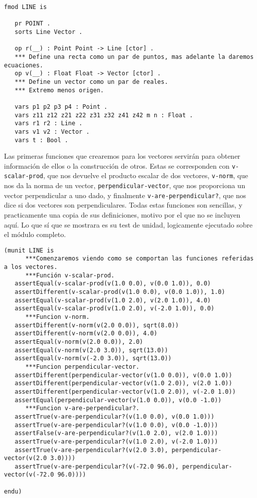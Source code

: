 {\codesize
\begin{verbatim}
fmod LINE is 

   pr POINT .
   sorts Line Vector .

   op r(__) : Point Point -> Line [ctor] .
   *** Define una recta como un par de puntos, mas adelante la daremos ecuaciones.
   op v(__) : Float Float -> Vector [ctor] .
   *** Define un vector como un par de reales.
   *** Extremo menos origen.

   vars p1 p2 p3 p4 : Point .
   vars z11 z12 z21 z22 z31 z32 z41 z42 m n : Float .
   vars r1 r2 : Line .
   vars v1 v2 : Vector .
   vars t : Bool .
\end{verbatim}
}

Las primeras funciones que crearemos para los vectores servirán para obtener información de ellos o la construcción de otros. Estas se corresponden con \texttt{v-scalar-prod}, que nos devuelve el producto escalar de dos vectores, \texttt{v-norm}, que nos da la norma de un vector, \texttt{perpendicular-vector}, que nos proporciona un vector perpendicular a uno dado, y finalmente \texttt{v-are-perpendicular?}, que nos dice si dos vectores son perpendiculares. Todas estas funciones son sencillas, y practicamente una copia de sus definiciones, motivo por el que no se incluyen aquí. Lo que sí que se mostrara es su test de unidad, logicamente ejecutado sobre el módulo completo.\par

{\codesize
\begin{verbatim}
(munit LINE is
      ***Comenzaremos viendo como se comportan las funciones referidas a los vectores.
      ***Función v-scalar-prod.
   assertEqual(v-scalar-prod(v(1.0 0.0), v(0.0 1.0)), 0.0)
   assertDifferent(v-scalar-prod(v(1.0 0.0), v(0.0 1.0)), 1.0)
   assertEqual(v-scalar-prod(v(1.0 2.0), v(2.0 1.0)), 4.0)
   assertEqual(v-scalar-prod(v(1.0 2.0), v(-2.0 1.0)), 0.0)		
      ***Funcion v-norm.
   assertDifferent(v-norm(v(2.0 0.0)), sqrt(8.0))
   assertDifferent(v-norm(v(2.0 0.0)), 4.0)
   assertEqual(v-norm(v(2.0 0.0)), 2.0)
   assertEqual(v-norm(v(2.0 3.0)), sqrt(13.0))
   assertEqual(v-norm(v(-2.0 3.0)), sqrt(13.0))
      ***Funcion perpendicular-vector.
   assertDifferent(perpendicular-vector(v(1.0 0.0)), v(0.0 1.0))
   assertDifferent(perpendicular-vector(v(1.0 2.0)), v(2.0 1.0))
   assertDifferent(perpendicular-vector(v(1.0 2.0)), v(-2.0 1.0))
   assertEqual(perpendicular-vector(v(1.0 0.0)), v(0.0 -1.0))
      ***Funcion v-are-perpendicular?.
   assertTrue(v-are-perpendicular?(v(1.0 0.0), v(0.0 1.0)))
   assertTrue(v-are-perpendicular?(v(1.0 0.0), v(0.0 -1.0)))
   assertFalse(v-are-perpendicular?(v(1.0 2.0), v(2.0 1.0)))
   assertTrue(v-are-perpendicular?(v(1.0 2.0), v(-2.0 1.0)))
   assertTrue(v-are-perpendicular?(v(2.0 3.0), perpendicular-vector(v(2.0 3.0))))
   assertTrue(v-are-perpendicular?(v(-72.0 96.0), perpendicular-vector(v(-72.0 96.0))))

endu)
\end{verbatim}
}

